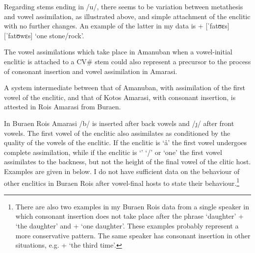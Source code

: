 Regarding stems ending in /u/, there seems to be variation
between metathesis and vowel assimilation, as illustrated
above, and simple attachment of the enclitic with no further changes.
An example of the latter in my data
is  +  {\ra}  [ˈfatʊɛs]{\tl}[ˈfatʊwɛs] `one stone/rock'.

The vowel assimilations which take place in Amanuban
when a vowel-initial enclitic is attached to a CV{\#}
stem could also represent a precursor to the process
of consonant insertion and vowel assimilation in Amarasi.

A system intermediate between that of Amanuban,
with assimilation of the first vowel of the enclitic,
and that of Kotos Amarasi, with consonant insertion,
is attested in Ro{\Q}is Amarasi from Buraen.

In Buraen Ro{\Q}is Amarasi /b/ is inserted after back vowels
and /\j/ after front vowels.
The first vowel of the enclitic also assimilates
as conditioned by the quality of the vowels of the enclitic.
If the enclitic is  `{\aa}' the first vowel undergoes
complete assimilation, while if the enclitic is  `{\ii}'
 `{\ee}/{\eeV}' or  `one' the first vowel
assimilates to the backness, but not the height of the final vowel of the clitic host.
Examples are given in  below.
I do not have sufficient data on the behaviour of other
enclitics in Buraen Ro{\Q}is after vowel-final hosts to state their behaviour.\footnote{
		There are also two examples in my Buraen Ro{\Q}is data from a single speaker
		in which consonant insertion does not take place
		after the phrase  `daughter' + 
		{\ra}  `the daughter' and + 
		{\ra}  `one daughter'.
		These examples probably represent a more conservative pattern.
		The same speaker has consonant insertion in other situations,
		e.g.  +  {\ra}  `the third time'.}

